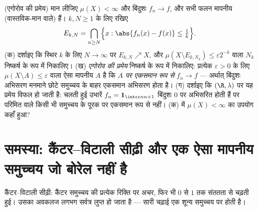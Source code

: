 \begin{exercise}[$\star\star\star$]\label{exo:b3:measure:12}
(एगोरोव की प्रमेय) मान लीजिए $\mu(X) < \infty$ और बिंदुशः $f_n \to f$, और सभी फलन
मापनीय (वास्तविक-मान वाले) हैं। $k, N \geq 1$ के लिए रखिए
\[
E_{k,N} = \bigcap_{n \geq N}\Bigl\{x : \abs{f_n(x) - f(x)}
\leq \tfrac1k\Bigr\} .
\]
(क) दर्शाइए कि स्थिर $k$ के लिए $N \to
\infty$ पर $E_{k,N} \nearrow X$, और $\mu(X \setminus E_{k,N_k})
\leq \varepsilon2^{-k}$ वाला
$N_k$ निष्कर्ष के रूप में निकालिए।
(ख) \emph{एगोरोव की प्रमेय} निष्कर्ष के रूप में निकालिए: प्रत्येक
$\varepsilon
> 0$ के लिए $\mu(X\setminus A) \leq
\varepsilon$ वाला ऐसा मापनीय $A$ है कि \emph{$A$ पर
एकसमान रूप से} $f_n \to f$ --- अर्थात् बिंदुशः अभिसरण मनमाने छोटे
समुच्चय के बाहर एकसमान अभिसरण होता है।
(ग) दर्शाइए कि $(\R, \lambda)$ पर यह प्रमेय विफल हो जाती है: चलती हुई
उभारें $f_n = \mathbf 1_{\intcc n{n+1}}$ बिंदुशः $0$ पर अभिसरित होती हैं पर परिमित  वाले
किसी भी समुच्चय के पूरक पर एकसमान रूप से नहीं। (क) में $\mu(X) < \infty$ का
उपयोग कहाँ हुआ?
\end{exercise}

\section{समस्या: कैंटर--विटाली सीढ़ी और एक ऐसा मापनीय समुच्चय जो
बोरेल नहीं है}

\begin{omfigure}

{\small कैंटर--विटाली सीढ़ी: कैंटर समुच्चय की प्रत्येक रिक्ति पर
अचर, फिर भी $0$ से $1$ तक संततता से चढ़ती हुई। उसका अवकलज
लगभग सर्वत्र लुप्त हो जाता है --- सारी चढ़ाई एक शून्य समुच्चय पर
होती है।}
\end{omfigure}

